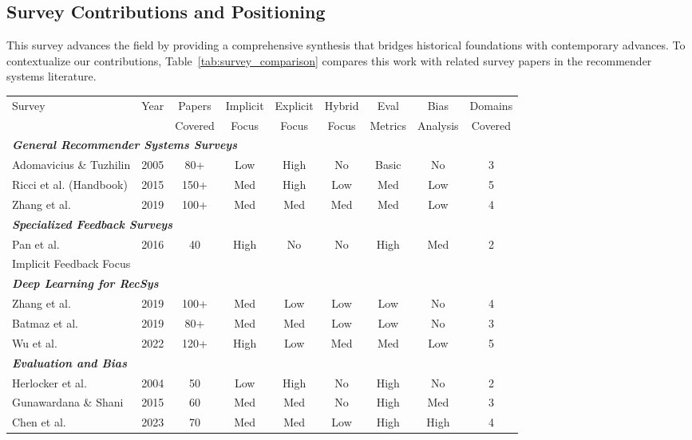 \subsection{Survey Contributions and Positioning}

This survey advances the field by providing a comprehensive synthesis that bridges historical foundations with contemporary advances. To contextualize our contributions, Table~\ref{tab:survey_comparison} compares this work with related survey papers in the recommender systems literature.

\begin{table*}[ht]
\centering
\tiny
\caption{Comparison with Related Survey Papers}
\label{tab:survey_comparison}
\begin{tabular}{@{}lcccccccc@{}}
\toprule
Survey & Year & Papers & Implicit & Explicit & Hybrid & Eval & Bias & Domains \\
 & & Covered & Focus & Focus & Focus & Metrics & Analysis & Covered \\
\midrule
\multicolumn{9}{l}{\textit{\textbf{General Recommender Systems Surveys}}} \\
\midrule
Adomavicius \& Tuzhilin & 2005 & 80+ & Low & High & No & Basic & No & 3 \\
Ricci et al. (Handbook) & 2015 & 150+ & Med & High & Low & Med & Low & 5 \\
Zhang et al. & 2019 & 100+ & Med & Med & Med & Med & Low & 4 \\
\midrule
\multicolumn{9}{l}{\textit{\textbf{Specialized Feedback Surveys}}} \\
\midrule
Pan et al. & 2016 & 40 & High & No & No & High & Med & 2 \\
Implicit Feedback Focus & & & & & & & & \\
\midrule
\multicolumn{9}{l}{\textit{\textbf{Deep Learning for RecSys}}} \\
\midrule
Zhang et al. & 2019 & 100+ & Med & Low & Low & Low & No & 4 \\
Batmaz et al. & 2019 & 80+ & Med & Med & Low & Low & No & 3 \\
Wu et al. & 2022 & 120+ & High & Low & Med & Med & Low & 5 \\
\midrule
\multicolumn{9}{l}{\textit{\textbf{Evaluation and Bias}}} \\
\midrule
Herlocker et al. & 2004 & 50 & Low & High & No & High & No & 2 \\
Gunawardana \& Shani & 2015 & 60 & Med & Med & No & High & Med & 3 \\
Chen et al. & 2023 & 70 & Med & Med & Low & High & High & 4 \\

\end{tabular}
\end{table*}
